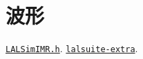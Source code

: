 \chapter{波形}

\href{https://lscsoft.docs.ligo.org/lalsuite/lalsimulation/group___l_a_l_sim_i_m_r__h.html}{\texttt{LALSimIMR.h}}. \href{https://git.ligo.org/lscsoft/lalsuite-extra/-/tree/master/data/lalsimulation?ref_type=heads}{\texttt{lalsuite-extra}}.
